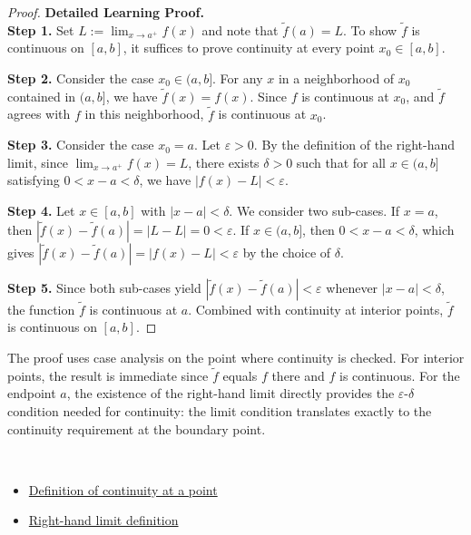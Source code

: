 \begin{proof}
\textbf{Detailed Learning Proof.}~\\

\textbf{Step 1.} Set $L := \lim_{x\to a^+} f(x)$ and note that $\widetilde{f}(a) = L$. To show $\widetilde{f}$ is continuous on $[a,b]$, it suffices to prove continuity at every point $x_0 \in [a,b]$.

\textbf{Step 2.} Consider the case $x_0 \in (a,b]$. For any $x$ in a neighborhood of $x_0$ contained in $(a,b]$, we have $\widetilde{f}(x) = f(x)$. Since $f$ is continuous at $x_0$, and $\widetilde{f}$ agrees with $f$ in this neighborhood, $\widetilde{f}$ is continuous at $x_0$.

\textbf{Step 3.} Consider the case $x_0 = a$. Let $\varepsilon > 0$. By the definition of the right-hand limit, since $\lim_{x\to a^+} f(x) = L$, there exists $\delta > 0$ such that for all $x \in (a,b]$ satisfying $0 < x - a < \delta$, we have $|f(x) - L| < \varepsilon$.

\textbf{Step 4.} Let $x \in [a,b]$ with $|x - a| < \delta$. We consider two sub-cases. If $x = a$, then $|\widetilde{f}(x) - \widetilde{f}(a)| = |L - L| = 0 < \varepsilon$. If $x \in (a,b]$, then $0 < x - a < \delta$, which gives $|\widetilde{f}(x) - \widetilde{f}(a)| = |f(x) - L| < \varepsilon$ by the choice of $\delta$.

\textbf{Step 5.} Since both sub-cases yield $|\widetilde{f}(x) - \widetilde{f}(a)| < \varepsilon$ whenever $|x - a| < \delta$, the function $\widetilde{f}$ is continuous at $a$. Combined with continuity at interior points, $\widetilde{f}$ is continuous on $[a,b]$.
\end{proof}

\begin{remark*}
The proof uses case analysis on the point where continuity is checked. For interior points, the result is immediate since $\widetilde{f}$ equals $f$ there and $f$ is continuous. For the endpoint $a$, the existence of the right-hand limit directly provides the $\varepsilon$-$\delta$ condition needed for continuity: the limit condition translates exactly to the continuity requirement at the boundary point.
\end{remark*}

\begin{remark*}[Dependencies]~\\
\begin{itemize}
  \item \hyperref[def:continuous-at-point]{Definition of continuity at a point}
  \item \hyperref[def:one-sided-limits]{Right-hand limit definition}
\end{itemize}
\end{remark*}
